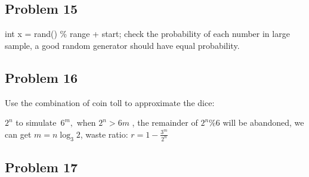 \documentclass[10pt]{article}
\begin{document}
\subsection*{Problem 15~}
int x = rand() \% range + start; check the probability of each number in large sample, a good random generator should have equal probability.

\subsection*{Problem 16~}
\qquad Use the combination of coin toll to approximate the dice:

$2^{n}$ to simulate~$6^{m} ,$ when $2^{n}>6m$ , the remainder of $2^{n} \%6$ will be abandoned, we can get $m =n\log _{3}2$, waste ratio: $r =1 -\frac{3^{m}}{2^{n}}$

\subsection*{Problem 17
}
\end{document}
